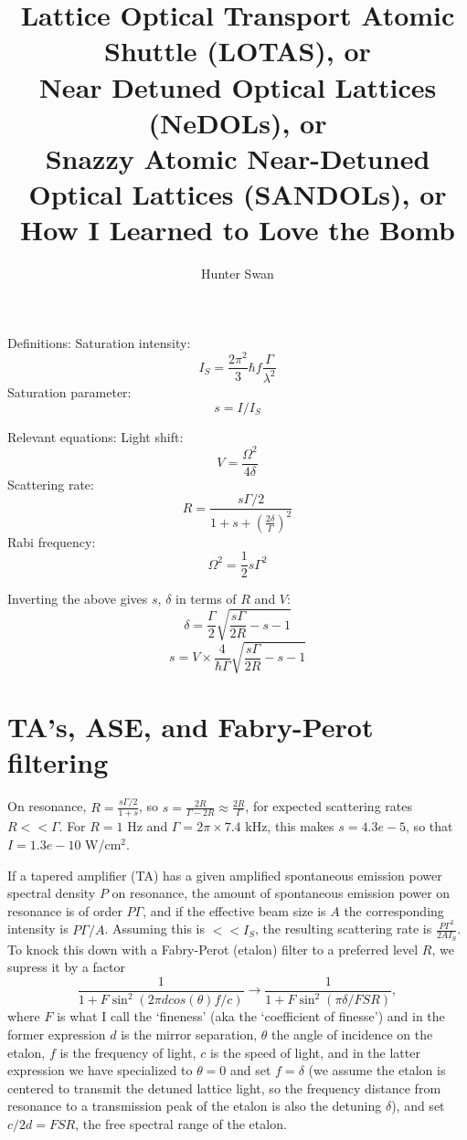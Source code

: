 \documentclass[aps,twocolumn,prb,floatfix,amsmath,amssymb,groupedaddress]{revtex4}
\begin{document}
\providecommand{\half}{{\frac{1}{2}}}		%

\title{Lattice Optical Transport Atomic Shuttle (LOTAS), or \\ Near Detuned Optical Lattices (NeDOLs), or \\ Snazzy Atomic Near-Detuned Optical Lattices (SANDOLs), or \\How I Learned to Love the Bomb}

\author{Hunter Swan}

\maketitle

Definitions:
Saturation intensity: \[I_S = \frac{2\pi^2}{3} \hbar f \frac{\Gamma}{\lambda^2}\]
Saturation parameter: \[s = I/I_S\]

Relevant equations:
Light shift: \[V = \frac{\Omega^2}{4\delta}\]
Scattering rate: \[R = \frac{s\Gamma/2}{1+s+\left(\frac{2\delta}{\Gamma}\right)^2}\]
Rabi frequency: \[\Omega^2 = \half s \Gamma^2\]

Inverting the above gives $s$, $\delta$ in terms of $R$ and $V$:
\[\delta = \frac{\Gamma}{2}\sqrt{\frac{s\Gamma}{2R}-s-1}\]
\[s = V \times \frac{4}{\hbar\Gamma} \sqrt{\frac{s\Gamma}{2R}-s-1}\]


\section{TA's, ASE, and Fabry-Perot filtering}
On resonance, $R = \frac{s\Gamma/2}{1+s}$, so $s=\frac{2R}{\Gamma-2R}\approx \frac{2R}{\Gamma}$, for expected scattering rates $R<<\Gamma$.  For $R=1$ Hz and $\Gamma=2\pi\times 7.4$ kHz, this makes $s=4.3e-5$, so that $I=1.3 e-10$ W/cm$^2$.

If a tapered amplifier (TA) has a given amplified spontaneous emission power spectral density $P$ on resonance, the amount of spontaneous emission power on resonance is of order $P\Gamma$, and if the effective beam size is $A$ the corresponding intensity is $P\Gamma/A$.  Assuming this is $<<I_S$, the resulting scattering rate is $\frac{P\Gamma^2}{2AI_S}$.  To knock this down with a Fabry-Perot (etalon) filter to a preferred level $R$, we supress it by a factor \[\frac{1}{1+F\sin^2\left( 2\pi d cos(\theta) f/c \right)} \rightarrow \frac{1}{1+F\sin^2\left( \pi \delta/FSR \right)},\]
where $F$ is what I call the `fineness' (aka the `coefficient of finesse') and in the former expression $d$ is the mirror separation, $\theta$ the angle of incidence on the etalon, $f$ is the frequency of light, $c$ is the speed of light, and in the latter expression we have specialized to $\theta=0$ and set $f=\delta$ (we assume the etalon is centered to transmit the detuned lattice light, so the frequency distance from resonance to a transmission peak of the etalon is also the detuning $\delta$), and set $c/2d = FSR$, the free spectral range of the etalon. 
\end{document}
